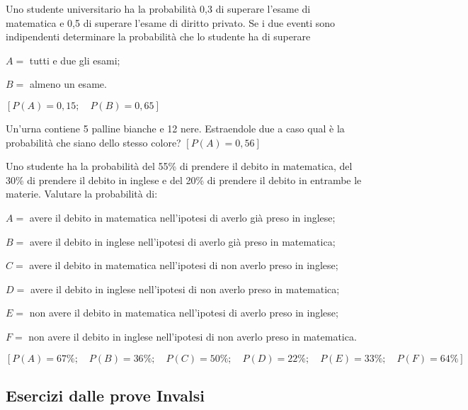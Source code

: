 \begin{esercizio}[\Ast]
 \label{ese:9.62}
Uno studente universitario ha la probabilità 0,3 di superare l'esame di 
matematica e 0,5 di superare l'esame di diritto privato. Se i due eventi sono 
indipendenti determinare la probabilità che lo studente ha di superare
\begin{itemize*}
\item $ A= $ tutti e due gli esami;
\item $ B= $ almeno un esame.
\end{itemize*}
\hfill $\left[P(A)=0,15; \quad P(B)=0,65\right]$
\end{esercizio}

\begin{esercizio}[\Ast]
 \label{ese:9.63}
Un'urna contiene 5 palline bianche e 12 nere. Estraendole due a caso qual è la 
probabilità che siano dello stesso colore?
\hfill $\left[P(A)=0,56\right]$
\end{esercizio}

\begin{esercizio}[\Ast]
 \label{ese:9.64}
Uno studente ha la probabilità del 55\% di prendere il debito in matematica, del 
30\% di prendere il debito in inglese e del 20\% di prendere il debito in 
entrambe le materie. Valutare la probabilità di:
\begin{itemize*}
\item $ A= $ avere il debito in matematica nell'ipotesi di averlo già preso in 
inglese;
\item $ B= $ avere il debito in inglese nell'ipotesi di averlo già preso in 
matematica;
\item $ C= $ avere il debito in matematica nell'ipotesi di non averlo preso in 
inglese;
\item $ D= $ avere il debito in inglese nell'ipotesi di non averlo preso in 
matematica;
\item $ E= $ non avere il debito in matematica nell'ipotesi di averlo preso in 
inglese;
\item $ F= $ non avere il debito in inglese nell'ipotesi di non averlo preso in 
matematica.
\end{itemize*}
\hfill $\left[P(A)=67\%; \quad P(B)=36\%; \quad P(C)=50\%; \quad P(D)=22\%; 
\quad P(E)=33\%; \quad P(F)=64\%\right]$
\end{esercizio}

\subsection*{Esercizi dalle prove Invalsi}

